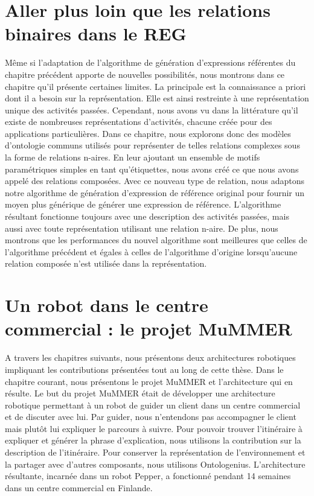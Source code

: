 \section*{Aller plus loin que les relations binaires dans le REG}

Même si l'adaptation de l'algorithme de génération d'expressions référentes du chapitre précédent apporte de nouvelles possibilités, nous montrons dans ce chapitre qu'il présente certaines limites. La principale est la connaissance a priori dont il a besoin sur la représentation. Elle est ainsi restreinte à une représentation unique des activités passées. Cependant, nous avons vu dans la littérature qu'il existe de nombreuses représentations d'activités, chacune créée pour des applications particulières. Dans ce chapitre, nous explorons donc des modèles d'ontologie communs utilisés pour représenter de telles relations complexes sous la forme de relations n-aires. En leur ajoutant un ensemble de motifs paramétriques simples en tant qu'étiquettes, nous avons créé ce que nous avons appelé des relations composées. Avec ce nouveau type de relation, nous adaptons notre algorithme de génération d'expression de référence original pour fournir un moyen plus générique de générer une expression de référence. L'algorithme résultant fonctionne toujours avec une description des activités passées, mais aussi avec toute représentation utilisant une relation n-aire. De plus, nous montrons que les performances du nouvel algorithme sont meilleures que celles de l'algorithme précédent et égales à celles de l'algorithme d'origine lorsqu'aucune relation composée n'est utilisée dans la représentation.

\section*{Un robot dans le centre commercial : le projet MuMMER}

A travers les chapitres suivants, nous présentons deux architectures robotiques impliquant les contributions présentées tout au long de cette thèse. Dans le chapitre courant, nous présentons le projet MuMMER et l'architecture qui en résulte. Le but du projet MuMMER était de développer une architecture robotique permettant à un robot de guider un client dans un centre commercial et de discuter avec lui. Par guider, nous n'entendons pas accompagner le client mais plutôt lui expliquer le parcours à suivre. Pour pouvoir trouver l'itinéraire à expliquer et générer la phrase d'explication, nous utilisons la contribution sur la description de l'itinéraire. Pour conserver la représentation de l'environnement et la partager avec d'autres composants, nous utilisons Ontologenius. L'architecture résultante, incarnée dans un robot Pepper, a fonctionné pendant 14 semaines dans un centre commercial en Finlande. 

